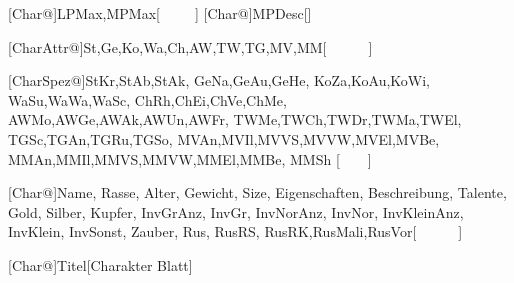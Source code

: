 \makeatletter
{}[Char@]{LPMax,MPMax}[\ \ \ \ \ ]
[Char@]{MPDesc}[]

[CharAttr@]{St,Ge,Ko,Wa,Ch,AW,TW,TG,MV,MM}[\ \ \ \ \ \ ]

[CharSpez@]{StKr,StAb,StAk,
										GeNa,GeAu,GeHe,
										KoZa,KoAu,KoWi,
										WaSu,WaWa,WaSc,
										ChRh,ChEi,ChVe,ChMe,
										AWMo,AWGe,AWAk,AWUn,AWFr,
										TWMe,TWCh,TWDr,TWMa,TWEl,
										TGSc,TGAn,TGRu,TGSo,
										MVAn,MVIl,MVVS,MVVW,MVEl,MVBe,
										MMAn,MMIl,MMVS,MMVW,MMEl,MMBe, MMSh}
										[\ \ \ \ ]

[Char@]{Name, Rasse, Alter, Gewicht, Size,
				Eigenschaften,
				Beschreibung,
				Talente,
				Gold, Silber, Kupfer,
				InvGrAnz, InvGr, InvNorAnz, InvNor, InvKleinAnz, InvKlein, InvSonst,
				Zauber,
				Rus, RusRS, RusRK,RusMali,RusVor}[\ \ \ \ \ \ ]

[Char@]{Titel}[Charakter Blatt]


\newcommand{\FillCell}[1]{
	\setstretch{0}\begin{normalsize}#1 \end{normalsize}
}

\newcommand{\CharacterSheetUser}{
\setkeys{CharacterSheet}{LPMax,MPMax,MPDesc}
\setkeys{CharacterSheet}{St,Ge,Ko,Wa,Ch,AW,TW,TG,MV,MM}
\setkeys{CharacterSheet}{StKr,StAb,StAk,
							GeNa,GeAu,GeHe,
							KoZa,KoAu,KoWi,
							WaSu,WaWa,WaSc,
							ChRh,ChEi,ChVe,ChMe,
							AWMo,AWGe,AWAk,AWUn,AWFr,
							TWMe,TWCh,TWDr,TWMa,TWEl,
							TGSc,TGAn,TGRu,TGSo,
							MVAn,MVIl,MVVS,MVVW,MVEl,MVBe,
							MMAn,MMIl,MMVS,MMVW,MMEl,MMBe, MMSh}
\setkeys{CharacterSheet}{Titel, Name, Rasse, Alter, Gewicht, Size,
				Eigenschaften,
				Beschreibung,
				Talente,
				Gold, Silber, Kupfer,
				InvGrAnz, InvGr, InvNorAnz, InvNor, InvKleinAnz, InvKlein, InvSonst,
				Zauber,
				Rus, RusRS, RusRK,RusMali,RusVor}
}

\newcommand{\charTab}[7][]{	\multirow{#2}{3cm}{#3:\nobreak\hfill#5\IfEq{}{#1}{}{\linebreak\begin{large}#1#7\end{large}}} & #4:\hfill #6\\}
\newcommand{\charTabExtraLine}[2]{\cline{3-3}&	&	#1:\hfill #2\\}
\newcommand{\rot}[1]{\begin{turn}{90}#1\end{turn}}

